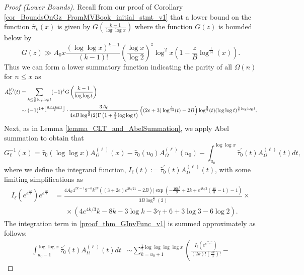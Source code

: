 \documentclass[11pt,reqno,a4letter]{article}
\numberwithin{figure}{section}
\numberwithin{table}{section}
\newcommand{\Floor}[2]{\ensuremath{\left\lfloor \frac{#1}{#2} \right\rfloor}}
\theoremstyle{plain}
\numberwithin{theorem}{section}
\theoremstyle{definition}
\begin{document}
\begin{proof}[Proof (Lower Bounds)] 
Recall from our proof of Corollary \ref{cor_BoundsOnGz_FromMVBook_initial_stmt_v1} that 
a lower bound on the function $\widehat{\pi}_k(x)$ is given by $G\left(\frac{k-1}{\log\log x}\right)$ 
where the function $G(z)$ is bounded below by 
\[
G(z) \gg A_0 x \frac{(\log\log x)^{k-1}}{(k-1)!} \left(\frac{\log x}{\log 2}\right)^{z} \log^2 x \left( 
     1 - \frac{z}{B} \log^{\frac{1}{14}}(x)\right). 
\]
Thus we can form a lower summatory function indicating the parity of all 
$\Omega(n)$ for $n \leq x$ as 
\begin{align} 
\notag 
A_{\Omega}^{(\ell)}(t) & = \sum_{k \leq \frac{3}{2}\log\log t} (-1)^k G\left(\frac{k-1}{\log\log t}\right) \\ 
\label{proof_thm_GInvFunc_v0} 
     & \sim (-1)^{1+\Floor{3\log\log t}{2}} \cdot 
     \frac{3A_0}{4eB \log^{\frac{3}{2}}(2) \Gamma\left(1 + \frac{3}{2}\log\log t\right)} \left( 
     (2e+3) \log^{\frac{1}{14}}(t) - 2B\right) 
     \log^{\frac{3}{2}}(t) (\log\log t)^{\frac{3}{2}\log\log t}. 
\end{align} 
Next, as in Lemma \ref{lemma_CLT_and_AbelSummation}, we apply Abel summation to obtain that  
\begin{equation} 
\label{proof_thm_GInvFunc_v1} 
G_{\ell}^{-1}(x) = \widehat{\tau}_0(\log\log x) A_{\Omega}^{(\ell)}(x) - 
     \widehat{\tau}_0(u_0) A_{\Omega}^{(\ell)}(u_0) - \int_{u_0}^{\log\log x} 
     \widehat{\tau}_0^{\prime}(t) A_{\Omega}^{(\ell)}(t) dt, 
\end{equation} 
where we define the integrand function, 
$I_{\ell}(t) := \widehat{\tau}_0^{\prime}(t) A_{\Omega}^{(\ell)}(t)$, 
with some limiting simplifications as 
\begin{align*} 
I_{\ell}\left(e^{e^{\frac{4k}{3}}}\right) e^{e^{\frac{4k}{3}}} & = 
     \frac{4A_0 4^{2 k-1} 9^{-k} k^{2k} \left((3+2 e) e^{2k/21}-2 B\right) ]
     \exp \left(-\frac{16 k^2}{9}+2k+e^{4k/3} 
     \left(\frac{4k}{3}-1\right)-1\right)}{3B \log ^{\frac{5}{2}}(2)} \times \\ 
     & \phantom{=\ } \times 
     \left(4 e^{4 k/3} k-8k-3 \log k-3 \gamma +6+3 
     \log 3-6 \log 2\right).
\end{align*} 
The integration term in \eqref{proof_thm_GInvFunc_v1} is summed approximately as follows: 
\begin{align*} 
\int_{u_0-1}^{\log\log x} \widehat{\tau}_0^{\prime}(t) A_{\Omega}^{(\ell)}(t) dt & \sim 
     \sum_{k=u_0+1}^{\frac{1}{2}\log\log\log\log x} \left( 
     \frac{I_{\ell}\left(e^{e^{\frac{4k+2}{3}}}\right)}{(2k)! \left(\frac{4k}{3}\right)!} - 

\end{align*}
\end{proof}
\end{document}
